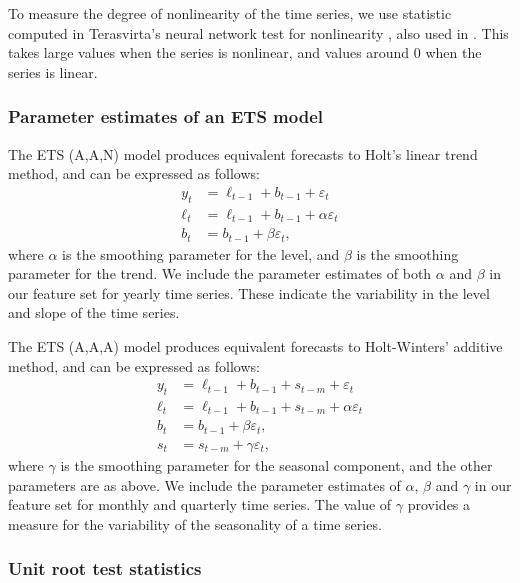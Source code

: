 \documentclass[11pt,a4paper,]{article}
\begin{document}
To measure the degree of nonlinearity of the time series, we use statistic computed in Terasvirta's neural network test for nonlinearity \autocite{nonlintest}, also used in \textcite{wang2009rule}. This takes large values when the series is nonlinear, and values around 0 when the series is linear.

\hypertarget{parameter-estimates-of-an-ets-model}{%
\subsubsection*{Parameter estimates of an ETS model}\label{parameter-estimates-of-an-ets-model}}

The ETS (A,A,N) model \autocite{expsmooth08} produces equivalent forecasts to Holt's linear trend method, and can be expressed as follows:
\begin{align*}
  y_t    & = \ell_{t-1}+b_{t-1}+\varepsilon_t\\
  \ell_t & = \ell_{t-1}+b_{t-1}+\alpha \varepsilon_t\\
  b_t    & = b_{t-1}+\beta \varepsilon_t,
\end{align*}
where \(\alpha\) is the smoothing parameter for the level, and \(\beta\) is the smoothing parameter for the trend. We include the parameter estimates of both \(\alpha\) and \(\beta\) in our feature set for yearly time series. These indicate the variability in the level and slope of the time series.

The ETS (A,A,A) model \autocite{expsmooth08} produces equivalent forecasts to Holt-Winters' additive method, and can be expressed as follows:
\begin{align*}
  y_t    & = \ell_{t-1}+b_{t-1}+s_{t-m}+\varepsilon_t\\
  \ell_t & = \ell_{t-1}+b_{t-1}+s_{t-m}+\alpha \varepsilon_t\\
  b_t    & = b_{t-1}+\beta \varepsilon_t,\\
  s_t &= s_{t-m} + \gamma\varepsilon_t,
\end{align*}
where \(\gamma\) is the smoothing parameter for the seasonal component, and the other parameters are as above. We include the parameter estimates of \(\alpha\), \(\beta\) and \(\gamma\) in our feature set for monthly and quarterly time series. The value of \(\gamma\) provides a measure for the variability of the seasonality of a time series.

\hypertarget{unit-root-test-statistics}{%
\subsubsection*{Unit root test statistics}\label{unit-root-test-statistics}}
\end{document}
